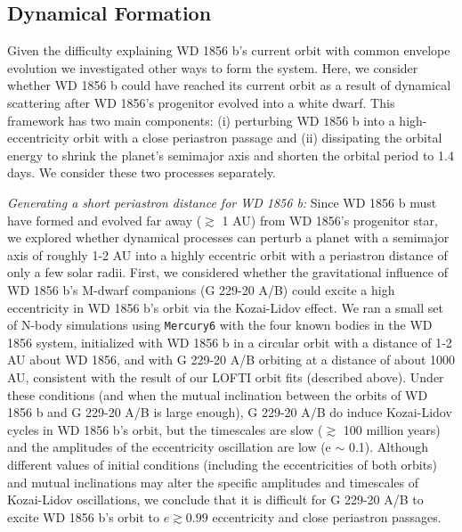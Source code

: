 \documentclass{nature3}
\newcommand*{\bedit}{\textcolor{new_black}}
\begin{document}
\begin{methods}
\subsection{Dynamical Formation}
Given the difficulty explaining WD 1856 b's current orbit with common envelope evolution we investigated other ways to form the system. Here, we consider whether WD 1856 b could have reached its current orbit as a result of dynamical scattering after WD 1856's progenitor evolved into a white dwarf. This \bedit{framework} has two main components: (i) perturbing WD 1856 b into a high-eccentricity orbit with a close periastron passage and (ii) dissipating the orbital energy to shrink the planet's semimajor axis and shorten the orbital period to 1.4 days. We consider these two processes separately. 

\textit{Generating a short periastron distance for WD 1856 b:} Since WD 1856 b must have formed and evolved far away ($\gtrsim$ 1 AU) from WD 1856's progenitor star, we explored whether dynamical processes can perturb a planet with a semimajor axis of roughly 1-2 AU into a highly eccentric orbit with a periastron distance of only a few solar radii. First, we considered whether the gravitational influence of WD 1856 b's M-dwarf companions (G 229-20 A/B) could excite a high eccentricity in WD 1856 b's orbit via the Kozai\cite{kozai}-Lidov\cite{lidov} effect\cite{stephan17}. We ran a small set of N-body simulations using \texttt{Mercury6}\cite{mercury6} with the four known bodies in the WD 1856 system, initialized with WD 1856 b in a circular orbit with a distance of 1-2 AU about WD 1856, and with G 229-20 A/B orbiting at a distance of about 1000 AU, consistent with the result of our LOFTI orbit fits (described above).  Under these conditions (and when the mutual inclination between the orbits of WD 1856 b and G 229-20 A/B is large enough), G 229-20 A/B do induce Kozai-Lidov cycles in WD 1856 b's orbit, but the timescales are slow ($\gtrsim$ 100 million years) and the amplitudes of the eccentricity oscillation are low (e $\sim$ 0.1). Although different values of initial conditions (including the eccentricities of both orbits) and mutual inclinations may alter the specific amplitudes and timescales of Kozai-Lidov oscillations, we conclude that it is difficult for G 229-20 A/B to excite WD 1856 b's orbit to $e\gtrsim 0.99$ eccentricity and close periastron passages.


\end{methods}
\end{document}
